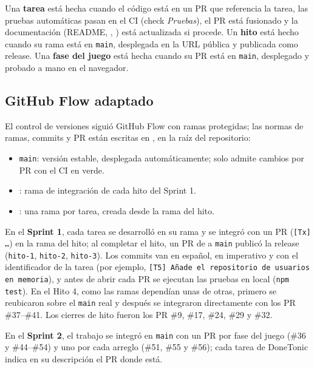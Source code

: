 Una \textbf{tarea} está hecha cuando el código está en un PR que referencia la tarea, las pruebas automáticas pasan en el CI (check \textit{Pruebas}), el PR está fusionado y la documentación (README, , ) está actualizada si procede. Un \textbf{hito} está hecho cuando su rama está en \texttt{main}, desplegada en la URL pública y publicada como release. Una \textbf{fase del juego} está hecha cuando su PR está en \texttt{main}, desplegado y probado a mano en el navegador.

\subsection{GitHub Flow adaptado}

El control de versiones siguió GitHub Flow \cite{githubflow} con ramas protegidas; las normas de ramas, commits y PR están escritas en , en la raíz del repositorio:

\begin{itemize}
    \item \texttt{main}: versión estable, desplegada automáticamente; solo admite cambios por PR con el CI en verde.
    \item {}: rama de integración de cada hito del Sprint 1.
    \item {}: una rama por tarea, creada desde la rama del hito.
\end{itemize}

En el \textbf{Sprint 1}, cada tarea se desarrolló en su rama  y se integró con un PR (\texttt{[Tx] …}) en la rama del hito; al completar el hito, un PR de  a \texttt{main} publicó la release (\texttt{hito-1}, \texttt{hito-2}, \texttt{hito-3}). Los commits van en español, en imperativo y con el identificador de la tarea (por ejemplo, \texttt{[T5] Añade el repositorio de usuarios en memoria}), y antes de abrir cada PR se ejecutan las pruebas en local (\texttt{npm test}). En el Hito 4, como las ramas dependían unas de otras, primero se reubicaron sobre el \texttt{main} real y después se integraron directamente con los PR \#37--\#41. Los cierres de hito fueron los PR \#9, \#17, \#24, \#29 y \#32.

En el \textbf{Sprint 2}, el trabajo se integró en \texttt{main} con un PR por fase del juego (\#36 y \#44--\#54) y uno por cada arreglo (\#51, \#55 y \#56); cada tarea de DoneTonic indica en su descripción el PR donde está.

